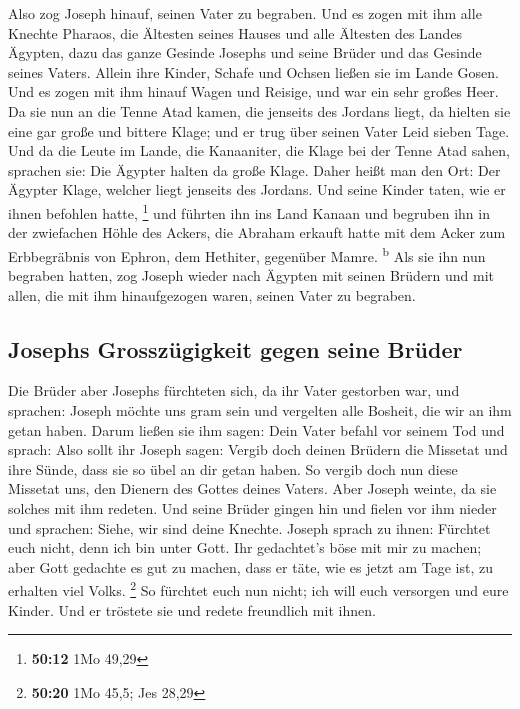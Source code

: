  Also zog Joseph hinauf, seinen Vater zu begraben. Und es
zogen mit ihm alle Knechte Pharaos, die Ältesten seines Hauses und alle
Ältesten des Landes Ägypten,  dazu das ganze Gesinde
Josephs und seine Brüder und das Gesinde seines Vaters. Allein ihre
Kinder, Schafe und Ochsen ließen sie im Lande Gosen.  Und
es zogen mit ihm hinauf Wagen und Reisige, und war ein sehr großes Heer.
 Da sie nun an die Tenne Atad kamen, die jenseits des
Jordans liegt, da hielten sie eine gar große und bittere Klage; und er
trug über seinen Vater Leid sieben Tage.  Und da die
Leute im Lande, die Kanaaniter, die Klage bei der Tenne Atad sahen,
sprachen sie: Die Ägypter halten da große Klage. Daher heißt man den
Ort: Der Ägypter Klage, welcher liegt jenseits des Jordans.
 Und seine Kinder taten, wie er ihnen befohlen hatte,
\footnote{\textbf{50:12} 1Mo 49,29}  und führten ihn ins
Land Kanaan und begruben ihn in der zwiefachen Höhle des Ackers, die
Abraham erkauft hatte mit dem Acker zum Erbbegräbnis von Ephron, dem
Hethiter, gegenüber Mamre. \textsuperscript{b}  Als sie
ihn nun begraben hatten, zog Joseph wieder nach Ägypten mit seinen
Brüdern und mit allen, die mit ihm hinaufgezogen waren, seinen Vater zu
begraben.

\hypertarget{josephs-grosszuxfcgigkeit-gegen-seine-bruxfcder}{%
\subsection{Josephs Grosszügigkeit gegen seine
Brüder}\label{josephs-grosszuxfcgigkeit-gegen-seine-bruxfcder}}

 Die Brüder aber Josephs fürchteten sich, da ihr Vater
gestorben war, und sprachen: Joseph möchte uns gram sein und vergelten
alle Bosheit, die wir an ihm getan haben.  Darum ließen
sie ihm sagen: Dein Vater befahl vor seinem Tod und sprach:
 Also sollt ihr Joseph sagen: Vergib doch deinen Brüdern
die Missetat und ihre Sünde, dass sie so übel an dir getan haben. So
vergib doch nun diese Missetat uns, den Dienern des Gottes deines
Vaters. Aber Joseph weinte, da sie solches mit ihm redeten.
 Und seine Brüder gingen hin und fielen vor ihm nieder
und sprachen: Siehe, wir sind deine Knechte.  Joseph
sprach zu ihnen: Fürchtet euch nicht, denn ich bin unter Gott.
 Ihr gedachtet's böse mit mir zu machen; aber Gott
gedachte es gut zu machen, dass er täte, wie es jetzt am Tage ist, zu
erhalten viel Volks. \footnote{\textbf{50:20} 1Mo 45,5; Jes 28,29}
 So fürchtet euch nun nicht; ich will euch versorgen und
eure Kinder. Und er tröstete sie und redete freundlich mit ihnen.

